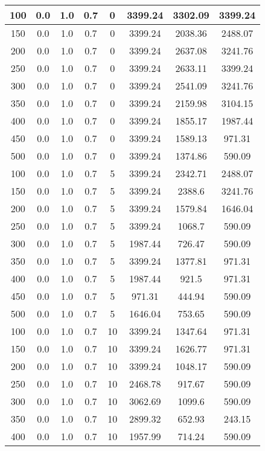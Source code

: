 \documentclass[a4paper, 12pt]{extreport}
\begin{document}
\begin{itemize}
\begin{longtable}{|c|c|c|c|c|c|c|c|}
			100 & 0.0 & 1.0 & 0.7 & 0 & 3399.24 & 3302.09 & 3399.24 \\\hline
			150 & 0.0 & 1.0 & 0.7 & 0 & 3399.24 & 2038.36 & 2488.07 \\\hline
			200 & 0.0 & 1.0 & 0.7 & 0 & 3399.24 & 2637.08 & 3241.76 \\\hline
			250 & 0.0 & 1.0 & 0.7 & 0 & 3399.24 & 2633.11 & 3399.24 \\\hline
			300 & 0.0 & 1.0 & 0.7 & 0 & 3399.24 & 2541.09 & 3241.76 \\\hline
			350 & 0.0 & 1.0 & 0.7 & 0 & 3399.24 & 2159.98 & 3104.15 \\\hline
			400 & 0.0 & 1.0 & 0.7 & 0 & 3399.24 & 1855.17 & 1987.44 \\\hline
			450 & 0.0 & 1.0 & 0.7 & 0 & 3399.24 & 1589.13 & 971.31 \\\hline
			500 & 0.0 & 1.0 & 0.7 & 0 & 3399.24 & 1374.86 & 590.09 \\\hline
			100 & 0.0 & 1.0 & 0.7 & 5 & 3399.24 & 2342.71 & 2488.07 \\\hline
			150 & 0.0 & 1.0 & 0.7 & 5 & 3399.24 & 2388.6 & 3241.76 \\\hline
			200 & 0.0 & 1.0 & 0.7 & 5 & 3399.24 & 1579.84 & 1646.04 \\\hline
			250 & 0.0 & 1.0 & 0.7 & 5 & 3399.24 & 1068.7 & 590.09 \\\hline
			300 & 0.0 & 1.0 & 0.7 & 5 & 1987.44 & 726.47 & 590.09 \\\hline
			350 & 0.0 & 1.0 & 0.7 & 5 & 3399.24 & 1377.81 & 971.31 \\\hline
			400 & 0.0 & 1.0 & 0.7 & 5 & 1987.44 & 921.5 & 971.31 \\\hline
			450 & 0.0 & 1.0 & 0.7 & 5 & 971.31 & 444.94 & 590.09 \\\hline
			500 & 0.0 & 1.0 & 0.7 & 5 & 1646.04 & 753.65 & 590.09 \\\hline
			100 & 0.0 & 1.0 & 0.7 & 10 & 3399.24 & 1347.64 & 971.31 \\\hline
			150 & 0.0 & 1.0 & 0.7 & 10 & 3399.24 & 1626.77 & 971.31 \\\hline
			200 & 0.0 & 1.0 & 0.7 & 10 & 3399.24 & 1048.17 & 590.09 \\\hline
			250 & 0.0 & 1.0 & 0.7 & 10 & 2468.78 & 917.67 & 590.09 \\\hline
			300 & 0.0 & 1.0 & 0.7 & 10 & 3062.69 & 1099.6 & 590.09 \\\hline
			350 & 0.0 & 1.0 & 0.7 & 10 & 2899.32 & 652.93 & 243.15 \\\hline
			400 & 0.0 & 1.0 & 0.7 & 10 & 1957.99 & 714.24 & 590.09 \\\hline

\end{longtable}
\end{itemize}
\end{document}
